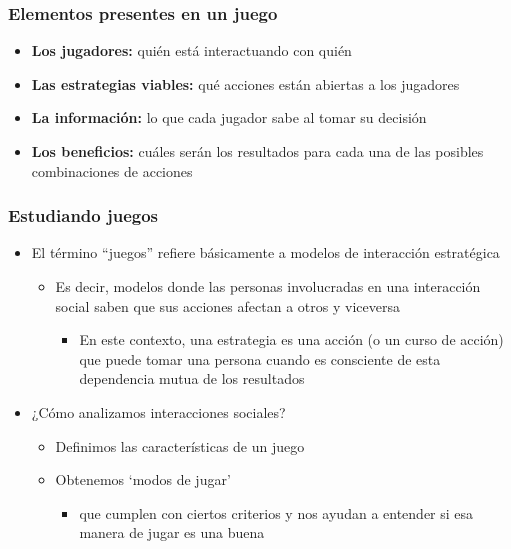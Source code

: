 \documentclass{beamer}
\begin{document}
\begin{frame}
\frametitle{ Elementos presentes en un juego}
\begin{itemize}
\item \textbf{Los jugadores:} quién está interactuando con quién
\item \textbf{Las estrategias viables:} qué acciones están abiertas a los jugadores
\item \textbf{La información:} lo que cada jugador sabe al tomar su decisión
\item \textbf{Los beneficios:} cuáles serán los resultados para cada una de las posibles combinaciones de acciones
\end{itemize}
\end{frame}

\begin{frame}
\frametitle{ Estudiando juegos}
\begin{itemize}
\item El término ``juegos'' refiere básicamente a modelos de interacción estratégica
\begin{itemize}
    \item Es decir, modelos donde las personas involucradas en una interacción social saben que sus acciones afectan a otros y viceversa
    \begin{itemize}
        \item En este contexto, una estrategia es una acción (o un curso de acción) que puede tomar una persona cuando es consciente de esta dependencia mutua de los resultados
    \end{itemize}
\end{itemize}
\item ¿Cómo analizamos interacciones sociales?
\begin{itemize}
    \item Definimos las características de un juego
    \item Obtenemos ‘modos de jugar’
    \begin{itemize}
        \item que cumplen con ciertos criterios y nos ayudan a entender si esa manera de jugar es una buena
    \end{itemize}
\end{itemize}
\end{itemize}
\end{frame}
\end{document}
